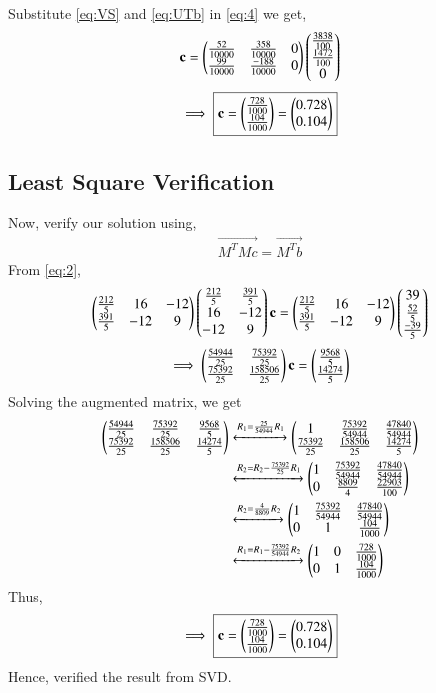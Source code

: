 \documentclass[journal,12pt,twocolumn]{IEEEtran}
\begin{document}
Substitute \eqref{eq:VS} and \eqref{eq:UTb} in \eqref{eq:4} we get,
\begin{align}
	 \mathbf{c} = \begin{pmatrix}\frac{52}{10000} & \frac{358}{10000} & 0 \\ \frac{99}{10000} & \frac{-188}{10000} & 0 \end{pmatrix}\begin{pmatrix}\frac{3838}{100}\\ \frac{1472}{100}\\ 0\end{pmatrix} 
\end{align}
\begin{align}
	\implies \boxed{\mathbf{c} = \begin{pmatrix}\frac{728}{1000}\\ \frac{104}{1000}\end{pmatrix} =\begin{pmatrix}0.728 \\ 0.104\end{pmatrix} }
\end{align} 
\subsection{Least Square Verification}
Now, verify our solution using,
\begin{align}
	 \vec{M^TMc} = \vec{M^Tb} 
\end{align}
From \eqref{eq:2},
\begin{align}
\begin{pmatrix}\frac{212}{5} & 16 & -12 \\ \frac{391}{5} & -12 & 9 \end{pmatrix} \begin{pmatrix}\frac{212}{5} & \frac{391}{5} \\ 16 & -12 \\ -12 & 9\end{pmatrix} \mathbf{c}= \begin{pmatrix}\frac{212}{5} & 16 & -12 \\ \frac{391}{5} & -12 & 9 \end{pmatrix} \begin{pmatrix}39 \\ \frac{52}{5}\\ \frac{-39}{5}\end{pmatrix}
\end{align}
\begin{align}
    \implies \begin{pmatrix}\frac{54944}{25} & \frac{75392}{25} \\ \frac{75392}{25} & \frac{158506}{25} \end{pmatrix} \mathbf{c}= \begin{pmatrix}\frac{9568}{5} \\ \frac{14274}{5} \end{pmatrix}
\end{align}
Solving the augmented matrix, we get
\begin{align}
\begin{pmatrix}\frac{54944}{25}&\frac{75392}{25}&\frac{9568}{5}\\\frac{75392}{25}&\frac{158506}{25}&\frac{14274}{5}\end{pmatrix} &\xleftrightarrow{R_1=\frac{25}{54944}R_1}\begin{pmatrix}1&\frac{75392}{54944}&\frac{47840}{54944}\\\frac{75392}{25}&\frac{158506}{25}&\frac{14274}{5}\end{pmatrix}\\
&\xleftrightarrow{R_2=R_2-\frac{75392}{25}R_1}\begin{pmatrix}1&\frac{75392}{54944}&\frac{47840}{54944}\\0&\frac{8809}{4}&\frac{22903}{100}\end{pmatrix}\\
&\xleftrightarrow{R_2=\frac{4}{8809}R_2}\begin{pmatrix}1&\frac{75392}{54944}&\frac{47840}{54944}\\0&1&\frac{104}{1000}\end{pmatrix}\\
&\xleftrightarrow{R_1=R_1-\frac{75392}{54944}R_2}\begin{pmatrix}1&0&\frac{728}{1000}\\0&1&\frac{104}{1000}\end{pmatrix}
\end{align}
Thus,
\begin{align}
    \implies \boxed{\mathbf{c}= \begin{pmatrix}\frac{728}{1000} \\ \frac{104}{1000} \end{pmatrix}= \begin{pmatrix}0.728 \\ 0.104\end{pmatrix}}
\end{align}
Hence, verified the result from SVD.
\end{document}
